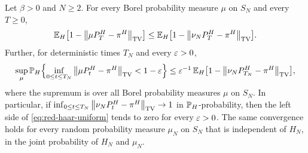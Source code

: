 \begin{theorem}\label{thm:red-haar}
Let $\beta>0$ and $N\ge2$. For every Borel probability measure $\mu$ on $S_N$ and every $T\ge0$,
\begin{equation}\label{eq:red-haar}
\mathbb E_H\bigl[1-\left\lVert\mu P^H_T-\pi^H\right\rVert_{\mathrm{TV}}\bigr]\le\mathbb E_H\bigl[1-\left\lVert\nu_NP^H_T-\pi^H\right\rVert_{\mathrm{TV}}\bigr].
\end{equation}
Further, for deterministic times $T_N$ and every $\varepsilon>0$,
\begin{equation}\label{eq:red-haar-uniform}
\sup_\mu\mathbb P_H\Bigl\{\inf_{0\le t\le T_N}\left\lVert\mu P^H_t-\pi^H\right\rVert_{\mathrm{TV}}<1-\varepsilon\Bigr\}\le\varepsilon^{-1}\,\mathbb E_H\bigl[1-\left\lVert\nu_NP^H_{T_N}-\pi^H\right\rVert_{\mathrm{TV}}\bigr],
\end{equation}
where the supremum is over all Borel probability measures $\mu$ on $S_N$. In particular, if $\inf_{0\le t\le T_N}\left\lVert\nu_NP^H_t-\pi^H\right\rVert_{\mathrm{TV}}\to1$ in $\mathbb P_H$-probability, then the left side of \eqref{eq:red-haar-uniform} tends to zero for every $\varepsilon>0$. The same convergence holds for every random probability measure $\mu_N$ on $S_N$ that is independent of $H_N$, in the joint probability of $H_N$ and $\mu_N$.
\end{theorem}


